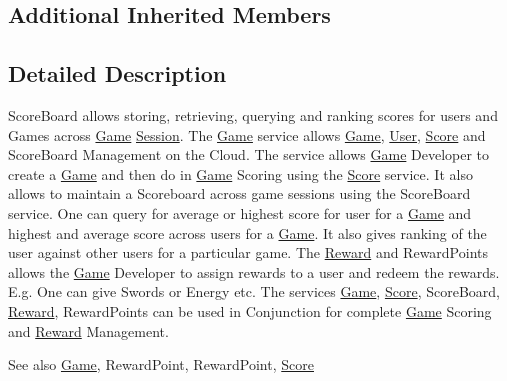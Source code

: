 \subsection*{Additional Inherited Members}


\subsection{Detailed Description}
Score\+Board allows storing, retrieving, querying and ranking scores for users and Games across \hyperlink{class_game}{Game} \hyperlink{class_session}{Session}. The \hyperlink{class_game}{Game} service allows \hyperlink{class_game}{Game}, \hyperlink{class_user}{User}, \hyperlink{class_score}{Score} and Score\+Board Management on the Cloud. The service allows \hyperlink{class_game}{Game} Developer to create a \hyperlink{class_game}{Game} and then do in \hyperlink{class_game}{Game} Scoring using the \hyperlink{class_score}{Score} service. It also allows to maintain a Scoreboard across game sessions using the Score\+Board service. One can query for average or highest score for user for a \hyperlink{class_game}{Game} and highest and average score across users for a \hyperlink{class_game}{Game}. It also gives ranking of the user against other users for a particular game. The \hyperlink{class_reward}{Reward} and Reward\+Points allows the \hyperlink{class_game}{Game} Developer to assign rewards to a user and redeem the rewards. E.\+g. One can give Swords or Energy etc. The services \hyperlink{class_game}{Game}, \hyperlink{class_score}{Score}, Score\+Board, \hyperlink{class_reward}{Reward}, Reward\+Points can be used in Conjunction for complete \hyperlink{class_game}{Game} Scoring and \hyperlink{class_reward}{Reward} Management.

\begin{DoxySeeAlso}{See also}
\hyperlink{class_game}{Game}, Reward\+Point, Reward\+Point, \hyperlink{class_score}{Score} 
\end{DoxySeeAlso}


